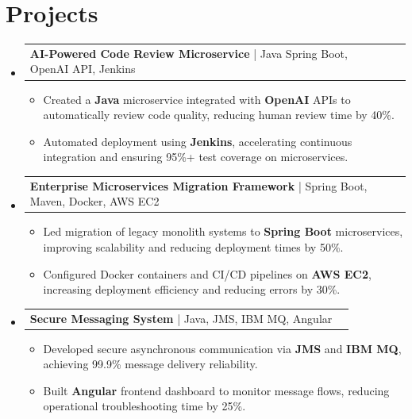 \documentclass[letterpaper,11pt]{article}
\makeatletter
\newcommand{\resumeItem}[1]{
  \item\footnotesize{
    {#1 \vspace{-2pt}}
  }
}
\newcommand{\resumeProjectHeading}[2]{
    \item
    \begin{tabular*}{1.001\textwidth}{l@{\extracolsep{\fill}}r}
      \small#1 & \textbf{\small #2}\\
    \end{tabular*}\vspace{-7pt}
}
\newcommand{\resumeSubHeadingListStart}{\begin{itemize}[leftmargin=0pt, label={}]}
\newcommand{\resumeSubHeadingListEnd}{\end{itemize}}
\newcommand{\resumeItemListStart}{\begin{itemize}[leftmargin=*]}
\newcommand{\resumeItemListEnd}{\end{itemize}\vspace{-5pt}}
\makeatother
\begin{document}
\section{Projects}
    \vspace{-5pt}
    \resumeSubHeadingListStart
      \resumeProjectHeading
          {\textbf{AI-Powered Code Review Microservice} | Java Spring Boot, OpenAI API, Jenkins}{}
          \resumeItemListStart
              \resumeItem{Created a \textbf{Java} microservice integrated with \textbf{OpenAI} APIs to automatically review code quality, reducing human review time by 40\%.}
              \resumeItem{Automated deployment using \textbf{Jenkins}, accelerating continuous integration and ensuring 95\%+ test coverage on microservices.}
          \resumeItemListEnd
          \vspace{-12pt}
      \resumeProjectHeading
          {\textbf{Enterprise Microservices Migration Framework} | Spring Boot, Maven, Docker, AWS EC2}{}
          \resumeItemListStart
              \resumeItem{Led migration of legacy monolith systems to \textbf{Spring Boot} microservices, improving scalability and reducing deployment times by 50\%.}
              \resumeItem{Configured Docker containers and CI/CD pipelines on \textbf{AWS EC2}, increasing deployment efficiency and reducing errors by 30\%.}
          \resumeItemListEnd
          \vspace{-12pt}
      \resumeProjectHeading
          {\textbf{Secure Messaging System} | Java, JMS, IBM MQ, Angular}{}
          \resumeItemListStart
              \resumeItem{Developed secure asynchronous communication via \textbf{JMS} and \textbf{IBM MQ}, achieving 99.9\% message delivery reliability.}
              \resumeItem{Built \textbf{Angular} frontend dashboard to monitor message flows, reducing operational troubleshooting time by 25\%.}
          \resumeItemListEnd 
    \resumeSubHeadingListEnd
\end{document}
